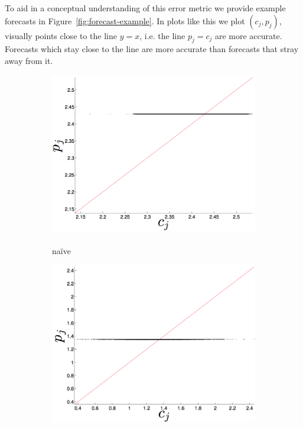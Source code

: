 To aid in a conceptual understanding of this error metric we provide example forecasts in Figure~\ref{fig:forecast-example}. In plots like this we plot $(c_j,p_j)$, visually points close to the line $y=x$, i.e. the line $p_j = c_j$ are more accurate. Forecasts which stay close to the line are more accurate than forecasts that stray away from it. 


\begin{figure}[htbp]
  \centering
      \begin{subfigure}{0.33\columnwidth}
    \includegraphics[width=\columnwidth]{figs/colMeanForecast.png}
    \caption{\col\\ na\"ive }
    \label{fig:gccMEAN}
  \end{subfigure}%
   \begin{subfigure}{0.32\columnwidth}
    \includegraphics[width=\columnwidth]{figs/gccMeanForecast.png}

\end{subfigure}
\end{figure}
